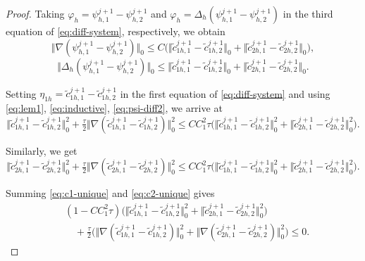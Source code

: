\begin{proof}
Taking $\varphi_{h}=\psi^{j+1}_{h,1}-\psi^{j+1}_{h,2}$ and
$\varphi_{h}=\Delta_{h}(\psi^{j+1}_{h,1}-\psi^{j+1}_{h,2})$ in the third
equation of \eqref{eq:diff-system}, respectively, we obtain
\begin{equation}
  \bigl\Vert\nabla(\psi^{j+1}_{h,1}-\psi^{j+1}_{h,2})\bigr\Vert_{0}
  \le C\bigl(\bigl\Vert\tilde{c}^{j+1}_{1h,1}-\tilde{c}^{j+1}_{1h,2}\bigr\Vert_{0}
           + \bigl\Vert\tilde{c}^{j+1}_{2h,1}-\tilde{c}^{j+1}_{2h,2}\bigr\Vert_{0}\bigr),
  \label{eq:psi-diff1}
\end{equation}
\begin{equation}
  \bigl\Vert\Delta_{h}(\psi^{j+1}_{h,1}-\psi^{j+1}_{h,2})\bigr\Vert_{0}
  \le \bigl\Vert\tilde{c}^{j+1}_{1h,1}-\tilde{c}^{j+1}_{1h,2}\bigr\Vert_{0}
    + \bigl\Vert\tilde{c}^{j+1}_{2h,1}-\tilde{c}^{j+1}_{2h,2}\bigr\Vert_{0}.
  \label{eq:psi-diff2}
\end{equation}

Setting $\eta_{1h}=\tilde{c}^{j+1}_{1h,1}-\tilde{c}^{j+1}_{1h,2}$ in the
first equation of \eqref{eq:diff-system} and using
\eqref{eq:lem1}, \eqref{eq:inductive}, \eqref{eq:psi-diff2}, we arrive at
\begin{equation}
  \bigl\Vert\tilde{c}^{j+1}_{1h,1}-\tilde{c}^{j+1}_{1h,2}\bigr\Vert_{0}^{2}
  + \tfrac{\tau}{2}\bigl\Vert\nabla(\tilde{c}^{j+1}_{1h,1}-\tilde{c}^{j+1}_{1h,2})\bigr\Vert_{0}^{2}
  \le CC_{1}^{2}\tau\bigl(\bigl\Vert\tilde{c}^{j+1}_{1h,1}-\tilde{c}^{j+1}_{1h,2}\bigr\Vert_{0}^{2}
      + \bigl\Vert\tilde{c}^{j+1}_{2h,1}-\tilde{c}^{j+1}_{2h,2}\bigr\Vert_{0}^{2}\bigr).
  \label{eq:c1-unique}
\end{equation}

Similarly, we get
\begin{equation}
  \bigl\Vert\tilde{c}^{j+1}_{2h,1}-\tilde{c}^{j+1}_{2h,2}\bigr\Vert_{0}^{2}
  + \tfrac{\tau}{2}\bigl\Vert\nabla(\tilde{c}^{j+1}_{2h,1}-\tilde{c}^{j+1}_{2h,2})\bigr\Vert_{0}^{2}
  \le CC_{1}^{2}\tau\bigl(\bigl\Vert\tilde{c}^{j+1}_{1h,1}-\tilde{c}^{j+1}_{1h,2}\bigr\Vert_{0}^{2}
      + \bigl\Vert\tilde{c}^{j+1}_{2h,1}-\tilde{c}^{j+1}_{2h,2}\bigr\Vert_{0}^{2}\bigr).
  \label{eq:c2-unique}
\end{equation}

Summing \eqref{eq:c1-unique} and \eqref{eq:c2-unique} gives
\begin{equation}
  \begin{aligned}
    &(1-CC_{1}^{2}\tau)
     \bigl(\bigl\Vert\tilde{c}^{j+1}_{1h,1}-\tilde{c}^{j+1}_{1h,2}\bigr\Vert_{0}^{2}
           + \bigl\Vert\tilde{c}^{j+1}_{2h,1}-\tilde{c}^{j+1}_{2h,2}\bigr\Vert_{0}^{2}\bigr)\\
    &\quad
     + \tfrac{\tau}{2}\bigl(\bigl\Vert\nabla(\tilde{c}^{j+1}_{1h,1}-\tilde{c}^{j+1}_{1h,2})\bigr\Vert_{0}^{2}
           + \bigl\Vert\nabla(\tilde{c}^{j+1}_{2h,1}-\tilde{c}^{j+1}_{2h,2})\bigr\Vert_{0}^{2}\bigr)
     \le 0.
  \end{aligned}
  \label{eq:c12-sum}
\end{equation}


\end{proof}

